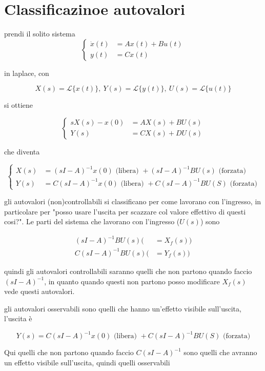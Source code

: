 \documentclass[11pt]{article}
\date{\today}
\title{}
\begin{document}
\tableofcontents

\section{Classificazinoe autovalori}
\label{sec:orgccbea91}

prendi il solito sistema
\[\begin{cases}
\dot{x}(t) &= Ax(t) + Bu(t) \\
y(t) &= Cx(t)
\end{cases}\]

in laplace, con

\[ X(s) = \mathcal{L}\{x(t)\},\ Y(s) = \mathcal{L}\{y(t)\},\ U(s) = \mathcal{L}\{u(t)\} \]

si ottiene

\[\begin{cases}
sX(s) - x(0) &= AX(s) + BU(s) \\
Y(s) &= CX(s) + DU(s)
\end{cases}\]

che diventa

\[\begin{cases}
X(s) &= (sI-A)^{-1}x(0) \text{ (libera) } + (sI-A)^{-1}BU(s) \text{ (forzata)} \\
Y(s) &= C(sI-A)^{-1}x(0) \text{ (libera) } + C(sI-A)^{-1}BU(S) \text{ (forzata)}
\end{cases}\]

gli autovalori (non)controllabili si classificano per come lavorano
con l'ingresso, in particolare per "posso usare l'uscita per scazzare
col valore effettivo di questi cosi?".
Le parti del sistema che lavorano con l'ingresso (\(U(s)\)) sono

\begin{align*}
(sI-A)^{-1}BU(s) ( &= X_f (s)) \\
C(sI-A)^{-1}BU(s) ( &= Y_f (s))
\end{align*}

quindi gli autovalori controllabili saranno quelli che non partono
quando faccio \((sI-A)^{-1}\), in quanto quando questi non partono posso
modificare \(X_f (s)\) vede questi autovalori.

gli autovalori osservabili sono quelli che hanno un'effetto visibile
sull'uscita, l'uscita è

\[ Y(s) = C(sI-A)^{-1}x(0) \text{ (libera) } + C(sI-A)^{-1}BU(S) \text{ (forzata)} \]

Qui quelli che non partono quando faccio \(C(sI-A)^{-1}\) sono quelli
che avranno un effetto visibile sull'uscita, quindi quelli osservabili
\end{document}
